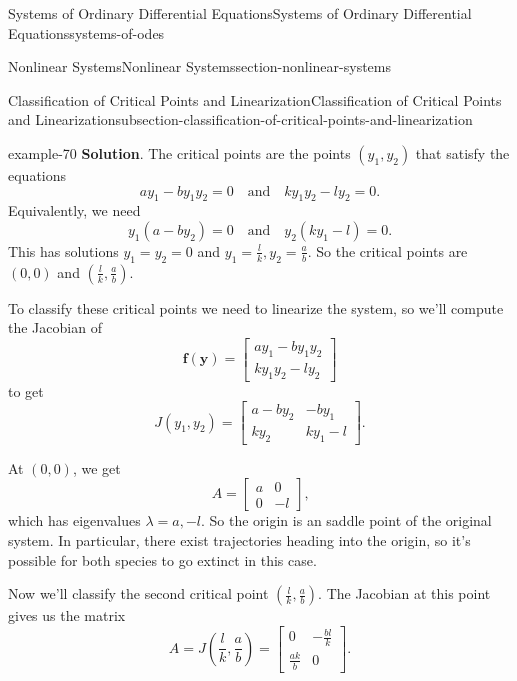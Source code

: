 \documentclass[oneside,10pt,]{book}
\numberwithin{equation}{section}
\renewcommand{\vec}[1]{\mathbf{#1}}
\newcommand{\amp}{&}
\begin{document}
\begin{chapterptx}{Systems of Ordinary Differential Equations}{}{Systems of Ordinary Differential Equations}{}{}{systems-of-odes}
\begin{sectionptx}{Nonlinear Systems}{}{Nonlinear Systems}{}{}{section-nonlinear-systems}
\begin{subsectionptx}{Classification of Critical Points and Linearization}{}{Classification of Critical Points and Linearization}{}{}{subsection-classification-of-critical-points-and-linearization}
\begin{example}{}{example-70}
\noindent\textbf{Solution}.\hypertarget{solution-67}{}\quad%
\hypertarget{p-419}{}%
The critical points are the points \((y_{1},y_{2})\) that satisfy the equations%
\begin{equation*}
ay_{1}-by_{1}y_{2} = 0\quad\text{and}\quad ky_{1}y_{2} - ly_{2} = 0.
\end{equation*}
Equivalently, we need%
\begin{equation*}
y_{1}(a-by_{2}) = 0\quad\text{and}\quad y_{2}(ky_{1}-l) = 0.
\end{equation*}
This has solutions \(y_{1} = y_{2} = 0\) and \(y_{1} = \frac{l}{k},y_{2} = \frac{a}{b}\). So the critical points are \((0,0)\) and \((\frac{l}{k},\frac{a}{b})\).%
\par
\hypertarget{p-420}{}%
To classify these critical points we need to linearize the system, so we'll compute the Jacobian of%
\begin{equation*}
\vec{f}(\vec{y}) = \begin{bmatrix}ay_{1}-by_{1}y_{2} \\ ky_{1}y_{2} - ly_{2}\end{bmatrix}
\end{equation*}
to get%
\begin{equation*}
J(y_{1},y_{2}) = \begin{bmatrix}a-by_{2} \amp  -by_{1} \\ ky_{2} \amp  ky_{1} - l\end{bmatrix}.
\end{equation*}
%
\par
\hypertarget{p-421}{}%
At \((0,0)\), we get%
\begin{equation*}
A = \begin{bmatrix}a \amp  0 \\ 0 \amp  -l\end{bmatrix}\text{,}
\end{equation*}
which has eigenvalues \(\lambda=a,-l\). So the origin is an saddle point of the original system. In particular, there exist trajectories heading into the origin, so it's possible for both species to go extinct in this case.%
\par
\hypertarget{p-422}{}%
Now we'll classify the second critical point \((\frac{l}{k},\frac{a}{b})\). The Jacobian at this point gives us the matrix%
\begin{equation*}
A = J(\frac{l}{k},\frac{a}{b}) = \begin{bmatrix}0 \amp  -\frac{bl}{k} \\ \frac{ak}{b} \amp  0\end{bmatrix}\text{.}

\end{equation*}
\end{example}
\end{subsectionptx}
\end{sectionptx}
\end{chapterptx}
\end{document}
